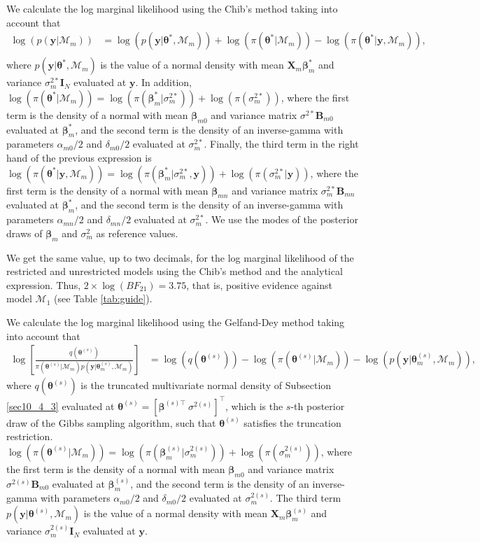 We calculate the log marginal likelihood using the Chib's method taking into account that 
\begin{align*}
	\log(p(\bm{y}|\mathcal{M}_m))&=\log(p(\bm{y}|\bm{\theta}^*,\mathcal{M}_m))+\log(\pi(\bm{\theta}^*|\mathcal{M}_m))-\log(\pi(\bm{\theta}^*|\bm{y},\mathcal{M}_m)),\\
\end{align*}
where $p(\bm{y}|\bm{\theta}^*,\mathcal{M}_m)$ is the value of a normal density with mean $\bm{X}_m\bm{\beta}_{m}^*$ and variance $\sigma^{2*}_m\bm{I}_N$ evaluated at $\bm{y}$. In addition, $\log(\pi(\bm{\theta}^*|\mathcal{M}_m))=\log(\pi(\bm{\beta}_m^*|\sigma^{2*}_m))+\log(\pi(\sigma^{2*}_m))$, where the first term is the density of a normal with mean $\bm{\beta}_{m0}$ and variance matrix $\sigma^{2*}\bm{B}_{m0}$ evaluated at $\bm{\beta}_m^*$, and the second term is the density of an inverse-gamma with parameters $\alpha_{m0}/2$ and $\delta_{m0}/2$ evaluated at $\sigma^{2*}_m$. Finally, the third term in the right hand of the previous expression is $\log(\pi(\bm{\theta}^*|\bm{y},\mathcal{M}_m))=\log(\pi(\bm{\beta}_m^*|\sigma^{2*}_m,\bm{y}))+\log(\pi(\sigma^{2*}_m|\bm{y}))$, where the first term is the density of a normal with mean $\bm{\beta}_{mn}$ and variance matrix $\sigma^{2*}_m\bm{B}_{mn}$ evaluated at $\bm{\beta}_m^*$, and the second term is the density of an inverse-gamma with parameters $\alpha_{mn}/2$ and $\delta_{mn}/2$ evaluated at $\sigma^{2*}_m$. We use the modes of the posterior draws of $\bm{\beta}_m$ and $\sigma^2_m$ as reference values. 

We get the same value, up to two decimals, for the log marginal likelihood of the restricted and unrestricted models using the Chib's method and the analytical expression. Thus, $2\times\log(BF_{21})=3.75$, that is, positive evidence against model $\mathcal{M}_1$ (see Table \ref{tab:guide}).

We calculate the log marginal likelihood using the Gelfand-Dey method taking into account that
\begin{align*}
	\log\left[\frac{q(\bm{\theta}^{(s)})}{\pi(\bm{\theta}^{(s)}|\mathcal{M}_m)p(\bm{y}|\bm{\theta}^{(s)}_m,\mathcal{M}_m)}\right]&=\log(q(\bm{\theta}^{(s)}))-\log(\pi(\bm{\theta}^{(s)}|\mathcal{M}_m))-\log(p(\bm{y}|\bm{\theta}^{(s)}_m,\mathcal{M}_m)),
\end{align*}
where $q(\bm{\theta}^{(s)})$ is the truncated multivariate normal density of Subsection \ref{sec10_4_3} evaluated at $\bm{\theta}^{(s)}=[\bm{\beta}^{(s)\top} \ \sigma^{2(s)}]^{\top}$, which is the $s$-th posterior draw of the Gibbs sampling algorithm, such that $\bm{\theta}^{(s)}$ satisfies the truncation restriction. $\log(\pi(\bm{\theta}^{(s)}|\mathcal{M}_m))=\log(\pi(\bm{\beta}_m^{(s)}|\sigma^{2(s)}_m))+\log(\pi(\sigma^{2(s)}_m))$, where the first term is the density of a normal with mean $\bm{\beta}_{m0}$ and variance matrix $\sigma^{2(s)}\bm{B}_{m0}$ evaluated at $\bm{\beta}_m^{(s)}$, and the second term is the density of an inverse-gamma with parameters $\alpha_{m0}/2$ and $\delta_{m0}/2$ evaluated at $\sigma^{2(s)}_m$. The third term $p(\bm{y}|\bm{\theta}^{(s)},\mathcal{M}_m)$ is the value of a normal density with mean $\bm{X}_m\bm{\beta}_{m}^{(s)}$ and variance $\sigma^{2(s)}_m\bm{I}_N$ evaluated at $\bm{y}$.

